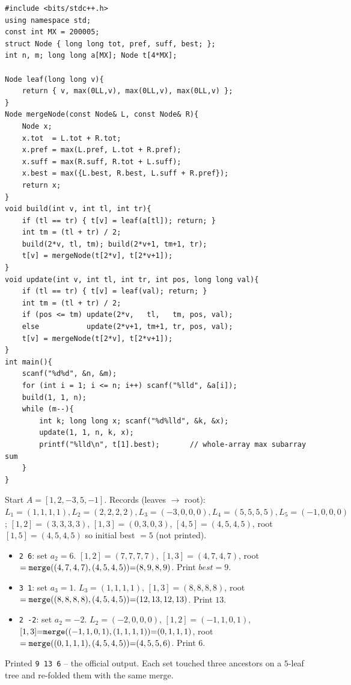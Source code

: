 \begin{lstlisting}[caption={CSES 1190 full solution (whole-array max subarray under point sets, tuple node)}, label={lst:c13-1190-soln}]
#include <bits/stdc++.h>
using namespace std;
const int MX = 200005;
struct Node { long long tot, pref, suff, best; };
int n, m; long long a[MX]; Node t[4*MX];

Node leaf(long long v){
    return { v, max(0LL,v), max(0LL,v), max(0LL,v) };
}
Node mergeNode(const Node& L, const Node& R){
    Node x;
    x.tot  = L.tot + R.tot;
    x.pref = max(L.pref, L.tot + R.pref);
    x.suff = max(R.suff, R.tot + L.suff);
    x.best = max({L.best, R.best, L.suff + R.pref});
    return x;
}
void build(int v, int tl, int tr){
    if (tl == tr) { t[v] = leaf(a[tl]); return; }
    int tm = (tl + tr) / 2;
    build(2*v, tl, tm); build(2*v+1, tm+1, tr);
    t[v] = mergeNode(t[2*v], t[2*v+1]);
}
void update(int v, int tl, int tr, int pos, long long val){
    if (tl == tr) { t[v] = leaf(val); return; }
    int tm = (tl + tr) / 2;
    if (pos <= tm) update(2*v,   tl,   tm, pos, val);
    else           update(2*v+1, tm+1, tr, pos, val);
    t[v] = mergeNode(t[2*v], t[2*v+1]);
}
int main(){
    scanf("%d%d", &n, &m);
    for (int i = 1; i <= n; i++) scanf("%lld", &a[i]);
    build(1, 1, n);
    while (m--){
        int k; long long x; scanf("%d%lld", &k, &x);
        update(1, 1, n, k, x);
        printf("%lld\n", t[1].best);       // whole-array max subarray sum
    }
}
\end{lstlisting}

\begin{tracebox}
Start \(A=[1,2,-3,5,-1]\).  Records (leaves \(\to\) root):
\(L_1{=}(1,1,1,1),L_2{=}(2,2,2,2),L_3{=}(-3,0,0,0),L_4{=}(5,5,5,5),L_5{=}(-1,0,0,0)\);
\([1,2]{=}(3,3,3,3)\), \([1,3]{=}(0,3,0,3)\), \([4,5]{=}(4,5,4,5)\),
root \([1,5]{=}(4,5,4,5)\) so initial best \(=5\) (not printed).
\begin{itemize}[nosep,leftmargin=1.4em]
  \item \texttt{2 6}: set \(a_2{=}6\).  \([1,2]{=}(7,7,7,7)\),
        \([1,3]{=}(4,7,4,7)\), root \(=\texttt{merge}((4,7,4,7),(4,5,4,5)){=}(8,9,8,9)\).
        Print \(\mathit{best}=9\).
  \item \texttt{3 1}: set \(a_3{=}1\).  \(L_3{=}(1,1,1,1)\), \([1,3]{=}(8,8,8,8)\),
        root \(=\texttt{merge}((8,8,8,8),(4,5,4,5)){=}(12,13,12,13)\).  Print \(13\).
  \item \texttt{2 -2}: set \(a_2{=}-2\).  \(L_2{=}(-2,0,0,0)\), \([1,2]{=}(-1,1,0,1)\),
        \([1,3]{=}\texttt{merge}((-1,1,0,1),(1,1,1,1)){=}(0,1,1,1)\),
        root \(=\texttt{merge}((0,1,1,1),(4,5,4,5)){=}(4,5,5,6)\).  Print \(6\).
\end{itemize}
Printed \texttt{9 13 6} -- the official output.  Each set touched three
ancestors on a \(5\)-leaf tree and re-folded them with the same merge.
\end{tracebox}

